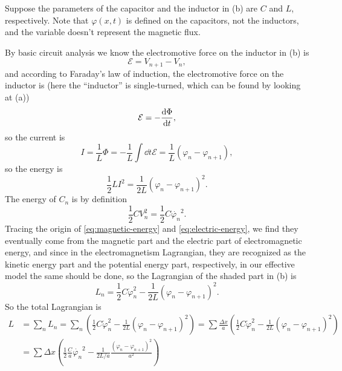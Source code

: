 \documentclass[hyperref, a4paper]{article}
\begin{document}
\begin{itemize}
Suppose the parameters of the capacitor and the inductor in (b)
are $C$ and $L$, respectively.
Note that $\varphi(x, t)$ is defined on the capacitors, not the inductors,
and the variable doesn't represent the magnetic flux.

By basic circuit analysis we know 
the electromotive force on the inductor in (b) is
\[
    \mathcal{E} = V_{n+1} - V_{n},
\]
and according to Faraday's law of induction, the electromotive force on the inductor is 
(here the ``inductor'' is single-turned, which can be found by looking at (a))
\[
    \mathcal{E} = - \dv{\Phi}{t},
\]
so the current is 
\[
    I = \frac{1}{L} \Phi = - \frac{1}{L} \int \dd{t} \mathcal{E} = \frac{1}{L} (\varphi_n - \varphi_{n+1}) ,
\]
so the energy is 
\begin{equation}
    \frac{1}{2} L I^2 = \frac{1}{2L} (\varphi_n - \varphi_{n+1})^2.
    \label{eq:magnetic-energy}
\end{equation}
The energy of $C_n$ is by definition
\begin{equation}
    \frac{1}{2} C V_n^2 = \frac{1}{2} C \dot{\varphi_n}^2.
    \label{eq:electric-energy}
\end{equation}
Tracing the origin of \eqref{eq:magnetic-energy} and \eqref{eq:electric-energy},
we find they eventually come from the magnetic part and the electric part of electromagnetic energy,
and since in the electromagnetism Lagrangian,
they are recognized as the kinetic energy part and the potential energy part, respectively,
in our effective model the same should be done, 
so the Lagrangian of the shaded part in (b) is
\begin{equation}
    L_{n} = \frac{1}{2} C \dot{\varphi}_n^2 - \frac{1}{2 L} (\varphi_n - \varphi_{n+1})^2.
\end{equation}
So the total Lagrangian is 
\begin{equation}
    \begin{aligned}
        L &= \sum_n L_n = 
        \sum_n \left( \frac{1}{2} C \dot{\varphi}_n^2 - \frac{1}{2 L} (\varphi_n - \varphi_{n+1})^2 \right) 
        = \sum \frac{\Delta{x}}{a} 
        \left( \frac{1}{2} C \dot{\varphi}_n^2 - \frac{1}{2 L} (\varphi_n - \varphi_{n+1})^2 \right) \\
        &= \sum \Delta{x} \left(
            \frac{1}{2} \frac{C}{a} \dot{\varphi_n}^2 
            - \frac{1}{2 L / a} 
            \frac{(\varphi_n - \varphi_{n+1})^2}{a^2}  
        \right) \\

\end{aligned}
\end{equation}
\end{itemize}
\end{document}
